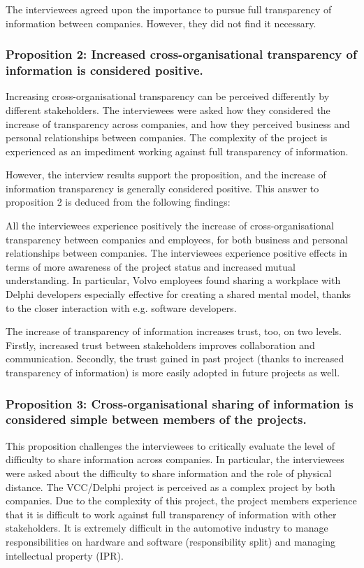  The interviewees agreed upon the importance to pursue full transparency of information between companies. However, they did not find it necessary.

\subsubsection{Proposition 2: Increased cross-organisational transparency of information is considered positive.}

Increasing cross-organisational transparency can be perceived differently by different stakeholders. The interviewees were asked how they considered the increase of transparency across companies, and how they perceived business and personal relationships between companies. The complexity of the project is experienced as an impediment working against full transparency of information.

However, the interview results support the proposition, and the increase of information transparency is generally considered positive. This answer to proposition 2 is deduced from the following findings:

 All the interviewees experience positively the increase of cross-organisational transparency between companies and employees, for both business and personal relationships between companies. The interviewees experience positive effects in terms of more awareness of the project status and increased mutual understanding. In particular, Volvo employees found sharing a workplace with Delphi developers especially effective for creating a shared mental model, thanks to the closer interaction with e.g. software developers.

 The increase of transparency of information increases trust, too, on two levels. Firstly, increased trust between stakeholders improves collaboration and communication. Secondly, the trust gained in past project (thanks to increased transparency of information) is more easily adopted in future projects as well. 

\subsubsection{Proposition 3: Cross-organisational sharing of information is considered simple between members of the projects.}

This proposition challenges the interviewees to critically evaluate the level of difficulty to share information across companies. In particular, the interviewees were asked about the difficulty to share information and the role of physical distance. The VCC/Delphi project is perceived as a complex project by both companies. Due to the complexity of this project, the project members experience that it is difficult to work against full transparency of information with other stakeholders. It is extremely difficult in the automotive industry to manage responsibilities on hardware and software (responsibility split) and managing intellectual property (IPR).

